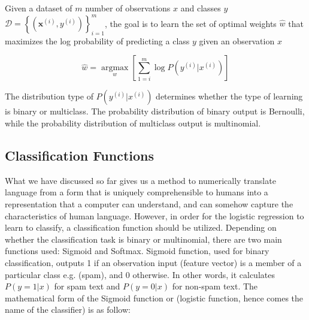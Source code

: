 
Given a dataset of $m$ number of observations $x$ and classes $y$ $\mathcal { D } = \left\{ \left( \boldsymbol { x } ^ { ( i ) } , y ^ { ( i ) } \right) \right\} _ { i = 1 } ^ { m }$, the goal is to learn the set of optimal weights $\hat{w}$ that maximizes the log probability of predicting a class $y$ given an observation $x$

\begin{equation}
\hat{w}=\underset{w}{\operatorname{argmax}}\left[\sum_{1=i}^{m} \log P\left(y^{(i)} | x^{(i)}\right)\right]
\end{equation}

The distribution type of $P\left(y^{(i)} | x^{(i)}\right)$ determines whether the type of learning is binary or multiclass. The probability distribution of binary output is Bernoulli, while the probability distribution of multiclass output is multinomial. 

\subsection{Classification Functions}
What we have discussed so far gives us a method to numerically translate language from a form that is uniquely comprehensible to humans into a representation that a computer can understand, and can somehow capture the characteristics of human language. However, in order for the logistic regression to learn to classify, a classification function should be utilized. Depending on whether the classification task is binary or multinomial, there are two main functions used: Sigmoid and Softmax. Sigmoid function, used for binary classification, outputs 1 if an observation input (feature vector) is a member of a particular class e.g. (spam), and 0 otherwise. In other words, it calculates $P(y=1|x)$ for spam text and $P(y=0|x)$ for non-spam text. The mathematical form of the Sigmoid function or (logistic function, hence comes the name of the classifier) is as follow:


